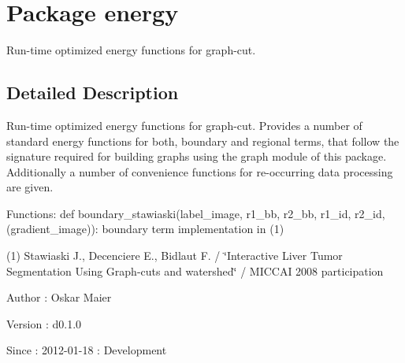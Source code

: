 \hypertarget{namespaceenergy}{
\section{Package energy}
\label{namespaceenergy}
}


Run-\/time optimized energy functions for graph-\/cut.  




\subsection{Detailed Description}
Run-\/time optimized energy functions for graph-\/cut. Provides a number of standard energy functions for both, boundary and regional terms, that follow the signature required for building graphs using the graph module of this package. Additionally a number of convenience functions for re-\/occurring data processing are given.

Functions: def boundary\_\-stawiaski(label\_\-image, r1\_\-bb, r2\_\-bb, r1\_\-id, r2\_\-id, (gradient\_\-image)): boundary term implementation in (1)

(1) Stawiaski J., Decenciere E., Bidlaut F. / \char`\"{}Interactive Liver Tumor Segmentation
 Using Graph-\/cuts and watershed\char`\"{} / MICCAI 2008 participation

\begin{DoxyAuthor}{Author}
: Oskar Maier 
\end{DoxyAuthor}
\begin{DoxyVersion}{Version}
: d0.1.0 
\end{DoxyVersion}
\begin{DoxySince}{Since}
: 2012-\/01-\/18 : Development 
\end{DoxySince}
